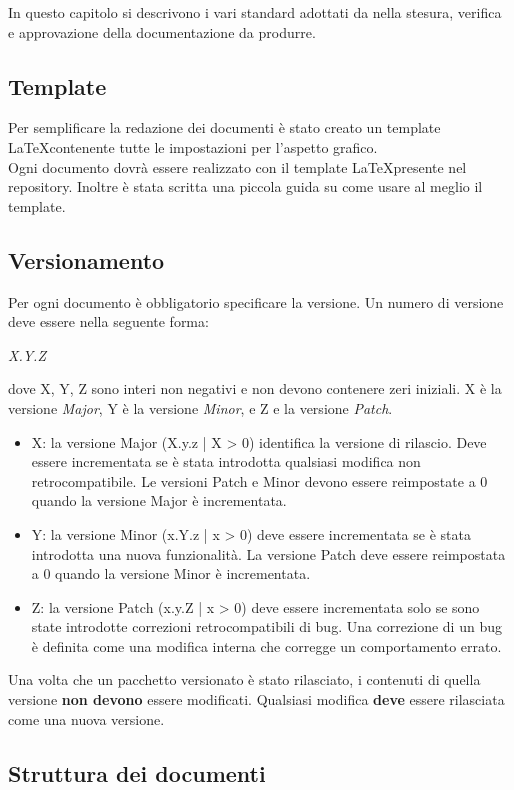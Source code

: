 In questo capitolo si descrivono i vari standard adottati da \GRUPPO nella stesura, verifica e approvazione della documentazione da produrre.
\subsection{Template}
Per semplificare la redazione dei documenti è stato creato un template \LaTeX contenente tutte le impostazioni per l'aspetto grafico. \\
Ogni documento dovrà essere realizzato con il template \LaTeX presente nel \gls{repository}. Inoltre è stata scritta una piccola guida su come usare al meglio il template.
\subsection{Versionamento}
Per ogni documento è obbligatorio specificare la versione. Un numero di versione deve essere nella seguente forma:
\begin{center}
	\emph{X.Y.Z}
\end{center}
dove X, Y, Z sono interi non negativi e non devono contenere zeri iniziali. X è la versione \textit{Major}, Y è la versione \textit{Minor}, e Z e la versione \textit{Patch}.
\begin{itemize}
	\item X: la versione Major (X.y.z | X > 0) identifica la versione di rilascio. Deve essere incrementata se è stata introdotta qualsiasi modifica non retrocompatibile. Le versioni Patch e Minor devono essere reimpostate a 0 quando la versione Major è incrementata. 
	\item Y: la versione Minor (x.Y.z | x > 0) deve essere incrementata se è stata introdotta una nuova funzionalità. La versione Patch deve essere reimpostata a 0 quando la versione Minor è incrementata.
	\item Z: la versione Patch (x.y.Z | x > 0) deve essere incrementata solo se sono state introdotte correzioni retrocompatibili di bug. Una correzione di un bug è definita come una modifica interna che corregge un comportamento errato.
\end{itemize}
Una volta che un pacchetto versionato è stato rilasciato, i contenuti di quella versione \textbf{non devono} essere modificati. Qualsiasi modifica \textbf{deve} essere rilasciata come una nuova versione.

\subsection{Struttura dei documenti}
